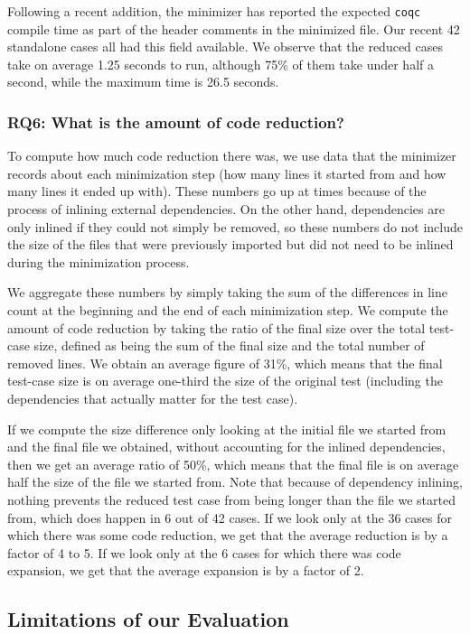 \documentclass[a4paper,USenglish,cleveref,autoref,thm-restate,pdfa]{lipics-v2021}
\begin{document}
Following a recent addition, the minimizer has reported the expected \texttt{coqc} compile time as part of the header comments in the minimized file. Our recent 42 standalone cases all had this field available. We observe that the reduced cases take on average 1.25 seconds to run, although 75\% of them take under half a second, while the maximum time is 26.5 seconds.

\subsubsection{RQ6: What is the amount of code reduction?}

To compute how much code reduction there was, we use data that the minimizer records about each minimization step (how many lines it started from and how many lines it ended up with). These numbers go up at times because of the process of inlining external dependencies. On the other hand, dependencies are only inlined if they could not simply be removed, so these numbers do not include the size of the files that were previously imported but did not need to be inlined during the minimization process.

We aggregate these numbers by simply taking the sum of the differences in line count at the beginning and the end of each minimization step. We compute the amount of code reduction by taking the ratio of the final size over the total test-case size, defined as being the sum of the final size and the total number of removed lines. We obtain an average figure of 31\%, which means that the final test-case size is on average one-third the size of the original test (including the dependencies that actually matter for the test case).

If we compute the size difference only looking at the initial file we started from and the final file we obtained, without accounting for the inlined dependencies, then we get an average ratio of 50\%, which means that the final file is on average half the size of the file we started from. Note that because of dependency inlining, nothing prevents the reduced test case from being longer than the file we started from, which does happen in 6 out of 42 cases. If we look only at the 36 cases for which there was some code reduction, we get that the average reduction is by a factor of 4 to 5. If we look only at the 6 cases for which there was code expansion, we get that the average expansion is by a factor of 2.

\subsection{Limitations of our Evaluation}
\end{document}
